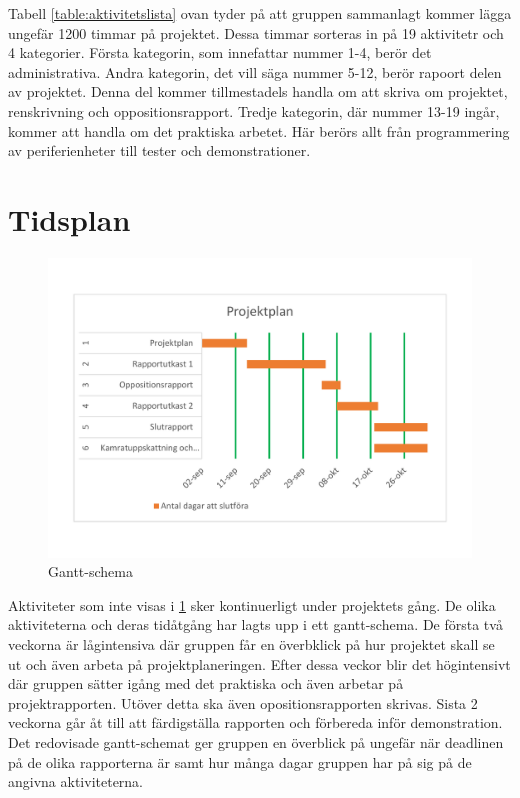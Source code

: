 \documentclass[a4paper]{article}
\begin{document}
Tabell \ref{table:aktivitetslista} ovan tyder på att gruppen sammanlagt kommer lägga ungefär 1200 timmar på projektet. Dessa timmar sorteras in på 19 aktivitetr och 4 kategorier. Första kategorin, som innefattar nummer 1-4, berör det administrativa. Andra kategorin, det vill säga nummer 5-12, berör rapoort delen av projektet. Denna del kommer tillmestadels handla om att skriva om projektet, renskrivning och oppositionsrapport. Tredje kategorin, där nummer 13-19 ingår, kommer att handla om det praktiska arbetet. Här berörs allt från programmering av periferienheter till tester och demonstrationer.


\section{Tidsplan}
\begin{figure}[H]
    \includegraphics[width=\textwidth]{Gantschema.pdf}
    \caption{Gantt-schema}
    \label{figure:gantt}
\end{figure}

Aktiviteter som inte visas i \ref{figure:gantt} sker kontinuerligt under projektets gång. De olika aktiviteterna och deras tidåtgång har lagts upp i ett gantt-schema. De första två veckorna är lågintensiva där gruppen får en överbklick på hur projektet skall se ut och även arbeta på projektplaneringen. Efter dessa veckor blir det högintensivt där gruppen sätter igång med det praktiska och även arbetar på projektrapporten. Utöver detta ska även opositionsrapporten skrivas. Sista 2 veckorna går åt till att färdigställa rapporten och förbereda inför demonstration. Det redovisade gantt-schemat ger gruppen en överblick på ungefär när deadlinen på de olika rapporterna är samt hur många dagar gruppen har på sig på de angivna aktiviteterna.
\end{document}
